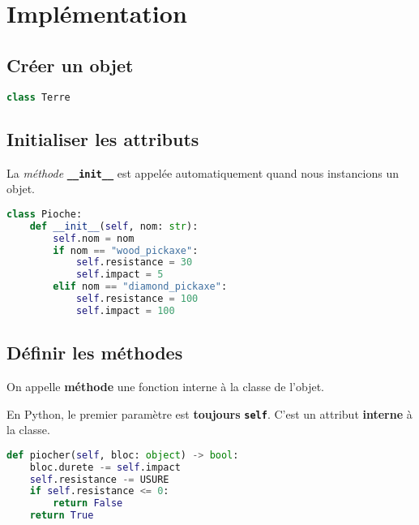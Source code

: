 \documentclass[a4paper,11pt]{article}
\begin{document}
\section{Implémentation}
\subsection{Créer un objet}
\begin{center}
\begin{lstlisting}[language=Python  , xleftmargin=2em, xrightmargin=2em]
class Terre
\end{lstlisting}
\label{CODE}
\end{center}
\subsection{Initialiser les attributs}
La \emph{méthode} \texttt{\textbf{\_\_init\_\_}} est appelée automatiquement quand nous instancions un objet.
\begin{center}
\begin{lstlisting}[language=Python , xleftmargin=2em, xrightmargin=2em]
class Pioche:
    def __init__(self, nom: str):
        self.nom = nom
        if nom == "wood_pickaxe":
            self.resistance = 30
            self.impact = 5
        elif nom == "diamond_pickaxe":
            self.resistance = 100
            self.impact = 100
\end{lstlisting}
\label{CODE}
\end{center}

\subsection{Définir les méthodes}
\begin{aretenir}
    On appelle \textbf{méthode} une fonction interne à la classe de l'objet. 

    En Python, le premier paramètre est \textbf{toujours} \textbf{\texttt{self}}. C'est un attribut \textbf{interne} à la classe.
\end{aretenir}
\begin{center}
    \begin{lstlisting}[language=Python, xleftmargin=2em, xrightmargin=2em]
def piocher(self, bloc: object) -> bool:
    bloc.durete -= self.impact
    self.resistance -= USURE
    if self.resistance <= 0:
        return False
    return True
\end{lstlisting}
    \label{CODE}
    \end{center}
\end{document}
